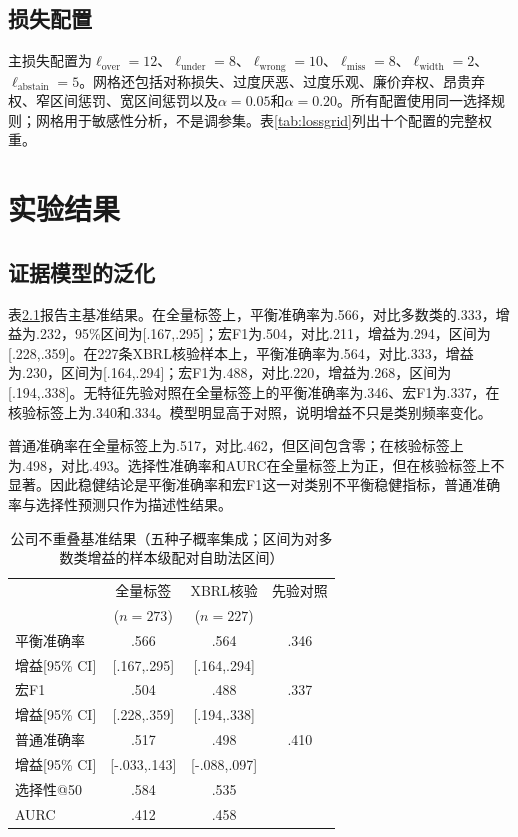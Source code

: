 \documentclass[12pt,openany]{ctexbook}
\begin{document}
\section{损失配置}
主损失配置为$\ell_{\text{over}}=12$、$\ell_{\text{under}}=8$、$\ell_{\text{wrong}}=10$、$\ell_{\text{miss}}=8$、$\ell_{\text{width}}=2$、$\ell_{\text{abstain}}=5$。网格还包括对称损失、过度厌恶、过度乐观、廉价弃权、昂贵弃权、窄区间惩罚、宽区间惩罚以及$\alpha=0.05$和$\alpha=0.20$。所有配置使用同一选择规则；网格用于敏感性分析，不是调参集。表\ref{tab:lossgrid}列出十个配置的完整权重。\par
\chapter{实验结果}
\label{ch:results}

\section{证据模型的泛化}
表\ref{tab:benchmark}报告主基准结果。在全量标签上，平衡准确率为.566，对比多数类的.333，增益为.232，95\%区间为[.167,.295]；宏F1为.504，对比.211，增益为.294，区间为[.228,.359]。在227条XBRL核验样本上，平衡准确率为.564，对比.333，增益为.230，区间为[.164,.294]；宏F1为.488，对比.220，增益为.268，区间为[.194,.338]。无特征先验对照在全量标签上的平衡准确率为.346、宏F1为.337，在核验标签上为.340和.334。模型明显高于对照，说明增益不只是类别频率变化。\par
普通准确率在全量标签上为.517，对比.462，但区间包含零；在核验标签上为.498，对比.493。选择性准确率和AURC在全量标签上为正，但在核验标签上不显著。因此稳健结论是平衡准确率和宏F1这一对类别不平衡稳健指标，普通准确率与选择性预测只作为描述性结果。\par
\begin{table}[htbp]
\centering
\caption{公司不重叠基准结果（五种子概率集成；区间为对多数类增益的样本级配对自助法区间）}
\label{tab:benchmark}
\begin{tabular}{lccc}
\toprule
 & 全量标签 & XBRL核验 & 先验对照 \\
 & ($n=273$) & ($n=227$) & \\
\midrule
平衡准确率 & .566 & .564 & .346 \\
\quad 增益[95\% CI] & [.167,.295] & [.164,.294] & \\
宏F1 & .504 & .488 & .337 \\
\quad 增益[95\% CI] & [.228,.359] & [.194,.338] & \\
普通准确率 & .517 & .498 & .410 \\
\quad 增益[95\% CI] & [-.033,.143] & [-.088,.097] & \\
选择性@50 & .584 & .535 & \\
AURC & .412 & .458 & \\
\bottomrule
\end{tabular}
\end{table}
\end{document}
